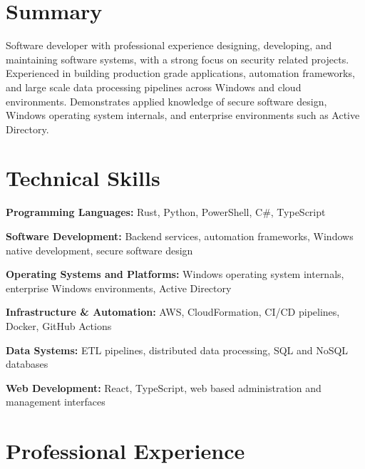 \documentclass{../styles/resume}
\begin{document}
\populatedtitle

\section{Summary}
    Software developer with professional experience designing, developing, and maintaining software systems, with a strong focus on security related projects. Experienced in building production grade applications, automation frameworks, and large scale data processing pipelines across Windows and cloud environments. Demonstrates applied knowledge of secure software design, Windows operating system internals, and enterprise environments such as Active Directory.

\section{Technical Skills}
\resumesublistbegin
    \item \textbf{Programming Languages:} Rust, Python, PowerShell, C\#, TypeScript
    \item \textbf{Software Development:} Backend services, automation frameworks, Windows native development, secure software design
    \item \textbf{Operating Systems and Platforms:} Windows operating system internals, enterprise Windows environments, Active Directory
    \item \textbf{Infrastructure \& Automation:} AWS, CloudFormation, CI/CD pipelines, Docker, GitHub Actions
    \item \textbf{Data Systems:} ETL pipelines, distributed data processing, SQL and NoSQL databases
    \item \textbf{Web Development:} React, TypeScript, web based administration and management interfaces
\resumesublistend

\section{Professional Experience}
\end{document}
